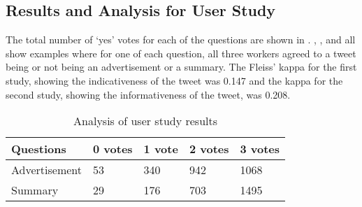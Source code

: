 
\subsection{Results and Analysis for User Study}



The total number of `yes' votes for each of the questions are shown in . , ,  and  all show examples where for one of each question, all three workers agreed to a tweet being or not being an advertisement or a summary. The Fleiss' kappa for the first study, showing the indicativeness of the tweet was 0.147 and the kappa for the second study, showing the informativeness of the tweet, was 0.208.

\begin{table}[!htbp]
\centering
\caption{Analysis of user study results}
\label{tab:yeses}
\begin{tabular}{|l|l|l|l|l|}
\hline
Questions     & 0 votes & 1 vote & 2 votes & 3 votes \\ \hline
Advertisement & 53    & 340    & 942     &  1068  \\ \hline
Summary       & 29     & 176    & 703     & 1495    \\ \hline
\end{tabular}
\end{table}


